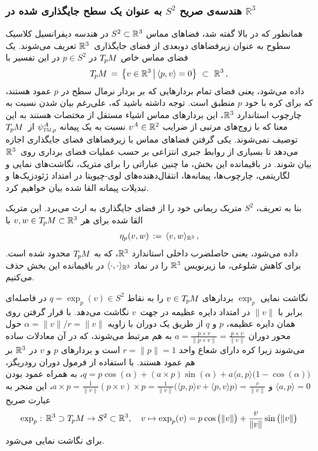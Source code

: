 \subsubsection*{هندسه‌ی صریح $S^2$ به عنوان یک سطح جایگذاری شده در $\mathds{R}^3$}
همانطور که در بالا گفته شد، فضاهای مماس $S^2 \subset \R^3$ در هندسه دیفرانسیل کلاسیک سطوح به عنوان زیرفضاهای دوبعدی از فضای جایگذاری~$\R^3$ تعریف می‌شوند.
یک فضای مماس خاص $\TpM$ در $p\in S^2$ در این تفسیر با
\begin{align}
    \TpM \,=\, \big\{ v\in\R^3 \,\big|\, \langle p,v \rangle = 0 \big\} \ \subset\ \R^3 \,,
\end{align}
داده می‌شود، یعنی فضای تمام بردارهایی که بر بردار نرمال سطح در $p$ عمود هستند، که برای کره با خود $p$ منطبق است.
توجه داشته باشید که، علی‌رغم بیان شدن نسبت به چارچوب استاندارد $\R^3$، این بردارهای مماس اشیاء مستقل از مختصات هستند به این معنا که با زوج‌های مرتبی از ضرایب $v^A \in \R^2$ نسبت به یک پیمانه $\psiTMp^A$ از~$\TpM$ توصیف نمی‌شوند.
یکی گرفتن فضاهای مماس با زیرفضاهای فضای جایگذاری اجازه می‌دهد تا بسیاری از روابط جبری انتزاعی بر حسب عملیات فضای برداری روی~$\R^3$ بیان شوند.
در باقیمانده این بخش، ما چنین عباراتی را برای متریک، نگاشت‌های نمایی و لگاریتمی، چارچوب‌ها، پیمانه‌ها، انتقال‌دهنده‌های لوی-چیویتا در امتداد ژئودزیک‌ها و تبدیلات پیمانه القا شده بیان خواهیم کرد.


بنا به تعریف، $S^2$ متریک ریمانی خود را از فضای جایگذاری به ارث می‌برد.
این متریک القا شده برای هر $v,w \in \TpM \subset \R^3$ با
\begin{align}\label{eq:spherical_embedding_metric_explicit}
    \eta_p(v,w) \,:=\, \langle v,w \rangle_{\R^3} \,,
\end{align}
داده می‌شود، یعنی حاصلضرب داخلی استاندارد $\R^3$، که به $\TpM$ محدود شده است.
برای کاهش شلوغی، ما زیرنویس $\R^3$ را در نماد $\langle \cdot,\cdot \rangle_{\R^3}$ در باقیمانده این بخش حذف می‌کنیم.


نگاشت نمایی $\exp_p$ بردارهای $v\in \TpM$ را به نقاط $q = \exp_p(v) \in S^2$ در فاصله‌ای برابر با $\lVert v\rVert$ در امتداد دایره عظیمه در جهت~$v$ نگاشت می‌دهد.
با قرار گرفتن روی همان دایره عظیمه، $p$ و $q$ از طریق یک دوران با زاویه $\alpha = \lVert v\rVert / r = \lVert v\rVert$ حول محور دوران $a = \frac{p\times v}{\lVert p \times v\rVert} = \frac{p\times v}{\lVert v\rVert}$ به هم مرتبط می‌شوند،
که در آن معادلات ساده می‌شوند زیرا کره دارای شعاع واحد $r = \lVert p\rVert = 1$ است و بردارهای $p$ و $v$ در $\R^3$ بر هم عمود هستند.
با استفاده از فرمول دوران رودریگز، $q = p \cos(\alpha) + (a\times p) \sin(\alpha) + a\langle a,p\rangle \big(1- \cos(\alpha) \big)$،
به همراه عمود بودن $\langle a,p\rangle = 0$ و
$a\times p
 = \frac{1}{\lVert v\rVert} (p\times v) \times p
 = \frac{1}{\lVert v\rVert} \big( \langle p,p\rangle v + \langle p,v\rangle p \big)
 = \frac{v}{\lVert v\rVert}$،
این منجر به عبارت صریح
\begin{align}\label{eq:sphere_expmap_explicit}
    \exp_p:\, \R^3 \supset \TpM \to S^2 \subset \R^3, \quad v \mapsto \exp_p(v) = p\mkern1mu \cos \big(\lVert v\rVert\big) + \frac{v}{\lVert v\rVert} \sin \big(\lVert v\rVert\big)
\end{align}
برای نگاشت نمایی می‌شود.

